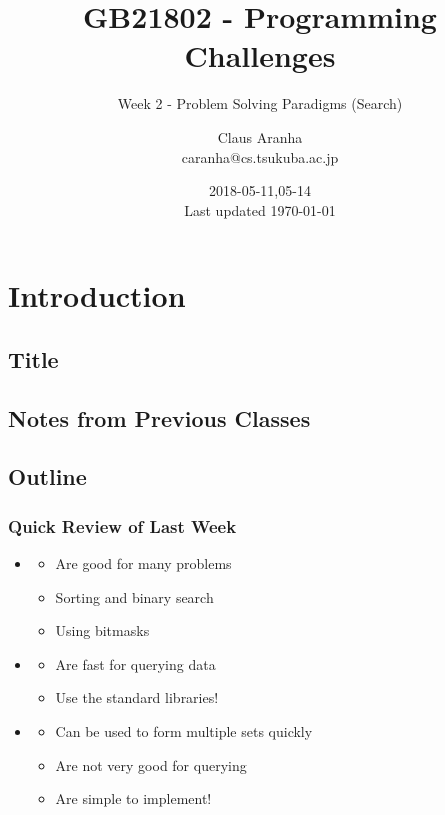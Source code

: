 \documentclass{beamer}
\title[GB21802]{GB21802 - Programming Challenges}
\subtitle[]{Week 2 - Problem Solving Paradigms (Search)}
\author[Claus Aranha]{Claus Aranha\\{\footnotesize caranha@cs.tsukuba.ac.jp}}
\institute{College of Information Science}
\date{2018-05-11,05-14\\{\tiny Last updated \today}}
\begin{document}
\section{Introduction}
\subsection{Title}
\begin{frame}
\maketitle
\end{frame}

\subsection{Notes from Previous Classes}



\subsection{Outline}

\begin{frame}
  \frametitle{Quick Review of Last Week}
  \begin{itemize}    
  \item {}
    \begin{itemize}
    \item Are good for many problems
    \item Sorting and binary search
    \item Using bitmasks
    \end{itemize}

    \medskip

  \item {}
    \begin{itemize}
    \item Are fast for querying data
    \item Use the standard libraries!
    \end{itemize}

    \medskip

  \item {}
    \begin{itemize}
    \item Can be used to form multiple sets quickly
    \item Are not very good for querying
    \item Are simple to implement!
    \end{itemize}
  \end{itemize}
\end{frame}
\end{document}
